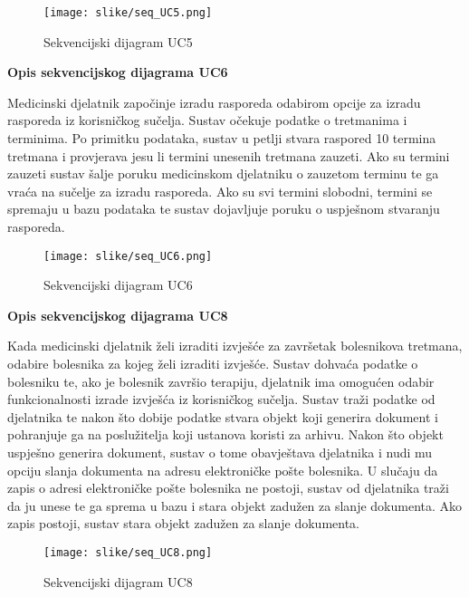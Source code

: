 					\begin{figure}[H]
					\texttt{[image: slike/seq\_UC5.png]} %
					\centering
					\caption{Sekvencijski dijagram UC5}
					\label{fig:seqUC5}			
				\end{figure}
			\eject
			
			\textbf{Opis sekvencijskog dijagrama UC6}
			\begin{flushleft}
				Medicinski djelatnik započinje izradu rasporeda odabirom opcije za izradu rasporeda iz korisničkog sučelja. Sustav očekuje podatke o tretmanima i terminima. Po primitku podataka, sustav u petlji stvara raspored 10 termina tretmana i provjerava jesu li termini unesenih tretmana zauzeti. Ako su termini zauzeti sustav šalje poruku medicinskom djelatniku o zauzetom terminu te ga vraća na sučelje za izradu rasporeda. Ako su svi termini slobodni, termini se spremaju u bazu podataka te sustav dojavljuje poruku o uspješnom stvaranju rasporeda.
			\end{flushleft}
			
			\begin{figure}[H]
				\texttt{[image: slike/seq\_UC6.png]} %
				\centering
				\caption{Sekvencijski dijagram UC6}
				\label{fig:seqUC6}			
			\end{figure}
		
		
		\pagebreak
		\textbf{Opis sekvencijskog dijagrama UC8}
		\begin{flushleft}
			Kada medicinski djelatnik želi izraditi izvješće za završetak bolesnikova tretmana, odabire bolesnika za kojeg želi izraditi izvješće. Sustav dohvaća podatke o bolesniku te, ako je bolesnik završio terapiju, djelatnik ima omogućen odabir funkcionalnosti izrade izvješća iz korisničkog sučelja. Sustav traži podatke od djelatnika te nakon što dobije podatke stvara objekt koji generira dokument i pohranjuje ga na poslužitelja koji ustanova koristi za arhivu. Nakon što objekt uspješno generira dokument, sustav o tome obavještava djelatnika i nudi mu opciju slanja dokumenta na adresu elektroničke pošte bolesnika. U slučaju da zapis o adresi elektroničke pošte bolesnika ne postoji, sustav od djelatnika traži da ju unese te ga sprema u bazu i stara objekt zadužen za slanje dokumenta.
			Ako zapis postoji, sustav stara objekt zadužen za slanje dokumenta.
		\end{flushleft}
		
		\begin{figure}[H]
			\texttt{[image: slike/seq\_UC8.png]} %
			\centering
			\caption{Sekvencijski dijagram UC8}
			\label{fig:seqUC8}			
		\end{figure}
	
